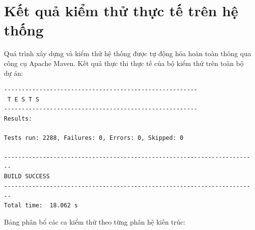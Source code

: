 \documentclass[a4paper,12pt]{report}
\begin{document}
\section{Kết quả kiểm thử thực tế trên hệ
thống}\label{kux1ebft-quux1ea3-kiux1ec3m-thux1eed-thux1ef1c-tux1ebf-truxean-hux1ec7-thux1ed1ng}

Quá trình xây dựng và kiểm thử hệ thống được tự động hóa hoàn toàn thông
qua công cụ Apache Maven. Kết quả thực thi thực tế của bộ kiểm thử trên
toàn bộ dự án:

\begin{lstlisting}
-------------------------------------------------------
 T E S T S
-------------------------------------------------------
Results:

Tests run: 2288, Failures: 0, Errors: 0, Skipped: 0

------------------------------------------------------------------------
BUILD SUCCESS
------------------------------------------------------------------------
Total time:  18.062 s
\end{lstlisting}

Bảng phân bổ các ca kiểm thử theo từng phân hệ kiến trúc:
\end{document}
